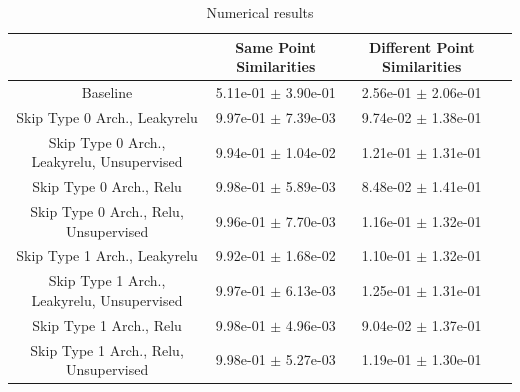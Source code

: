 \documentclass[a4paper]{article}
\begin{document}
\begin{table}[H]
    \begin{tabular}{|c|c|c|c|} \hline
                                      &  Same Point Similarities  &  Different Point Similarities  \\ \hline
Baseline   & 5.11e-01 $\pm$ 3.90e-01 & 2.56e-01 $\pm$ 2.06e-01 \\ \hline
Skip Type 0 Arch., Leakyrelu   & 9.97e-01 $\pm$ 7.39e-03 & 9.74e-02 $\pm$ 1.38e-01 \\ \hline
Skip Type 0 Arch., Leakyrelu, Unsupervised   & 9.94e-01 $\pm$ 1.04e-02 & 1.21e-01 $\pm$ 1.31e-01 \\ \hline
Skip Type 0 Arch., Relu   & 9.98e-01 $\pm$ 5.89e-03 & 8.48e-02 $\pm$ 1.41e-01 \\ \hline
Skip Type 0 Arch., Relu, Unsupervised  & 9.96e-01 $\pm$ 7.70e-03 & 1.16e-01 $\pm$ 1.32e-01 \\ \hline
Skip Type 1 Arch., Leakyrelu   & 9.92e-01 $\pm$ 1.68e-02 & 1.10e-01 $\pm$ 1.32e-01 \\ \hline
Skip Type 1 Arch., Leakyrelu, Unsupervised   & 9.97e-01 $\pm$ 6.13e-03 & 1.25e-01 $\pm$ 1.31e-01 \\ \hline
Skip Type 1 Arch., Relu   & 9.98e-01 $\pm$ 4.96e-03 & 9.04e-02 $\pm$ 1.37e-01 \\ \hline
Skip Type 1 Arch., Relu, Unsupervised   & 9.98e-01 $\pm$ 5.27e-03 & 1.19e-01 $\pm$ 1.30e-01 \\ \hline
      \end{tabular}
  \caption{Numerical results}
\end{table}
\end{document}
